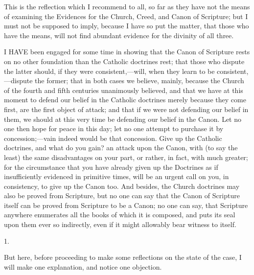 This is the reflection which I recommend to all, so far as they
have not the means of examining the Evidences for the Church, Creed,
and Canon of Scripture; but I must not be supposed to imply, because I
have so put the matter, that those who have the means, will not find
abundant evidence for the divinity of all three.


I HAVE been engaged for some time in showing that the Canon
of Scripture rests on no other foundation than the Catholic doctrines
rest; that those who dispute the latter should, if they were
consistent,—will, when they learn to be consistent,—dispute the
former; that in both cases we believe, mainly, because the Church of
the fourth and fifth centuries unanimously believed, and that we have
at this moment to defend our belief in the Catholic doctrines merely
because they come first, are the first object of attack; and that if
we were not defending our belief in them, we should at this very time
be defending our belief in the Canon. Let no one then hope for peace
in this day; let no one attempt to purchase it by concession;—vain
indeed would be that concession. Give up the Catholic doctrines, and
what do you gain? an attack upon the Canon, with (to say the least)
the same disadvantages on your part, or rather, in fact, with much
greater; for the circumstance that you have already given up the
Doctrines as if insufficiently evidenced in primitive times, will be
an urgent call on you, in consistency, to give up the Canon too. And
besides, the Church doctrines may also be proved from Scripture, but
no one can say that the Canon of Scripture itself can be proved from
Scripture to be a Canon; no one can say, that Scripture anywhere enumerates all the books of which it is composed, and puts its seal
upon them ever so indirectly, even if it might allowably bear witness
to itself.

1.

But here, before proceeding to make some reflections on the state
of the case, I will make one explanation, and notice one objection.

